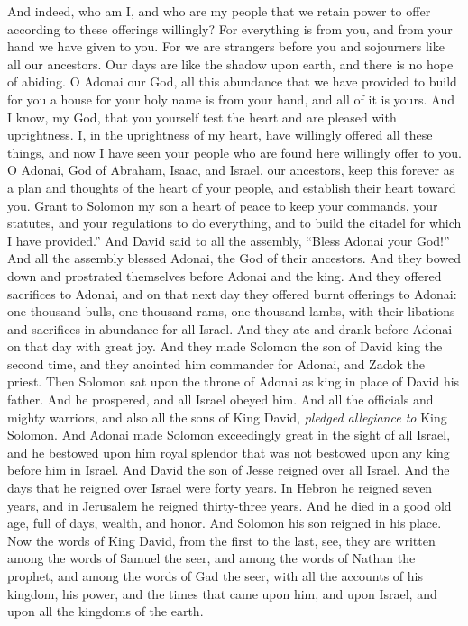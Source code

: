 \begin{biblechapter}
\verse And indeed, who am I, and who are my people that we retain power to offer according to these offerings willingly? For everything is from you, and from your hand we have given to you.
\verse For we are strangers before you and sojourners like all our ancestors. Our days are like the shadow upon earth, and there is no hope of abiding.
\verse O Adonai our God, all this abundance that we have provided to build for you a house for your holy name is from your hand, and all of it is yours.
\verse And I know, my God, that you yourself test the heart and are pleased with uprightness. I, in the uprightness of my heart, have willingly offered all these things, and now I have seen your people who are found here willingly offer to you.
\verse O Adonai, God of Abraham, Isaac, and Israel, our ancestors, keep this forever as a plan and thoughts of the heart of your people, and establish their heart toward you.
\verse Grant to Solomon my son a heart of peace to keep your commands, your statutes, and your regulations to do everything, and to build the citadel for which I have provided.”
\verse And David said to all the assembly, “Bless Adonai your God!” And all the assembly blessed Adonai, the God of their ancestors. And they bowed down and prostrated themselves before Adonai and the king.
 And they offered sacrifices to Adonai, and on that next day they offered burnt offerings to Adonai: one thousand bulls, one thousand rams, one thousand lambs, with their libations and sacrifices in abundance for all Israel.
\verse And they ate and drank before Adonai on that day with great joy. And they made Solomon the son of David king the second time, and they anointed him commander for Adonai, and Zadok the priest.
\verse Then Solomon sat upon the throne of Adonai as king in place of David his father. And he prospered, and all Israel obeyed him.
\verse And all the officials and mighty warriors, and also all the sons of King David, \textit{pledged allegiance to} King Solomon.
\verse And Adonai made Solomon exceedingly great in the sight of all Israel, and he bestowed upon him royal splendor that was not bestowed upon any king before him in Israel.
 And David the son of Jesse reigned over all Israel.
\verse And the days that he reigned over Israel were forty years. In Hebron he reigned seven years, and in Jerusalem he reigned thirty-three years.
\verse And he died in a good old age, full of days, wealth, and honor. And Solomon his son reigned in his place.
\verse Now the words of King David, from the first to the last, see, they are written among the words of Samuel the seer, and among the words of Nathan the prophet, and among the words of Gad the seer,
\verse with all the accounts of his kingdom, his power, and the times that came upon him, and upon Israel, and upon all the kingdoms of the earth.
\end{biblechapter}

